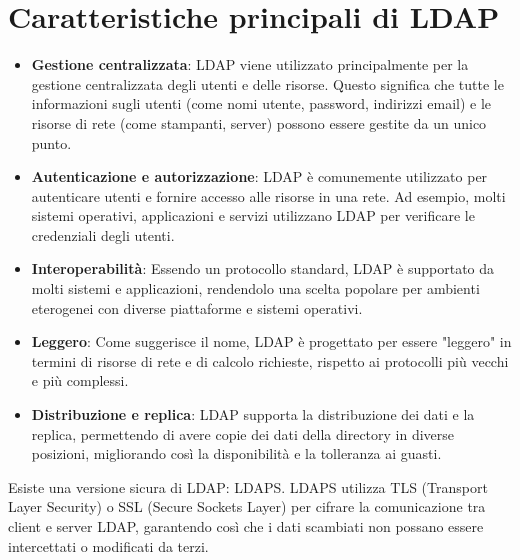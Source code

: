 \documentclass[12pt]{report}
\begin{document}
\section{Caratteristiche principali di LDAP}
\begin{itemize}
    \item \textbf{Gestione centralizzata}: LDAP viene utilizzato principalmente per la gestione centralizzata degli utenti e delle risorse. Questo significa che tutte le informazioni sugli utenti (come nomi utente, password, indirizzi email) e le risorse di rete (come stampanti, server) possono essere gestite da un unico punto.
    \item \textbf{Autenticazione e autorizzazione}: LDAP è comunemente utilizzato per autenticare utenti e fornire accesso alle risorse in una rete. Ad esempio, molti sistemi operativi, applicazioni e servizi utilizzano LDAP per verificare le credenziali degli utenti.
    \item \textbf{Interoperabilità}: Essendo un protocollo standard, LDAP è supportato da molti sistemi e applicazioni, rendendolo una scelta popolare per ambienti eterogenei con diverse piattaforme e sistemi operativi.
    \item \textbf{Leggero}: Come suggerisce il nome, LDAP è progettato per essere "leggero" in termini di risorse di rete e di calcolo richieste, rispetto ai protocolli più vecchi e più complessi.
    \item \textbf{Distribuzione e replica}: LDAP supporta la distribuzione dei dati e la replica, permettendo di avere copie dei dati della directory in diverse posizioni, migliorando così la disponibilità e la tolleranza ai guasti.
\end{itemize}
Esiste una versione sicura di LDAP: LDAPS. LDAPS utilizza TLS (Transport Layer Security) o SSL (Secure Sockets Layer) per cifrare la comunicazione tra client e server LDAP, garantendo così che i dati scambiati non possano essere intercettati o modificati da terzi.
\end{document}
